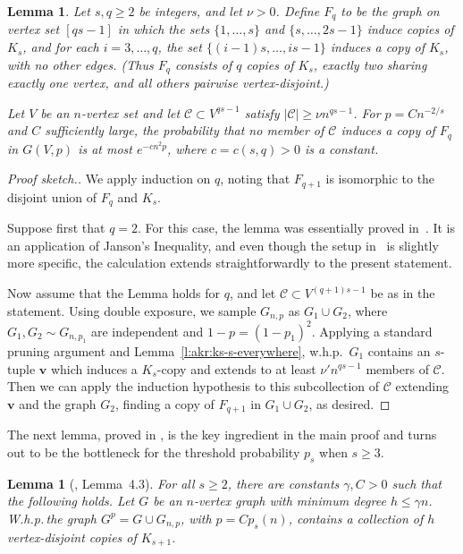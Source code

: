 \documentclass[reqno, 12pt]{amsart}
\numberwithin{equation}{section}
\numberwithin{figure}{section}
\theoremstyle{plain}
\newtheorem{lemma}[thm]{Lemma}
\theoremstyle{definition}
\def\cC{{\mathcal C}}
\def \Gnp{G_{n,p}}
\begin{document}
    \begin{lemma}
        \label{l:many_ks_and_one_ks-ks}
        Let $s,q\ge 2$ be integers, and let $\nu>0$.  
Define $F_q$ to be the graph on vertex set $[qs-1]$ in which the sets
$\{1,\dots,s\}$ and $\{s,\dots,2s-1\}$ induce copies of $K_s$, and for each
$i=3,\dots,q$, the set $\{(i-1)s,\dots,is-1\}$ induces a copy of $K_s$,
with no other edges. (Thus $F_q$ consists of $q$ copies of $K_s$, exactly two
sharing exactly one vertex, and all others pairwise vertex-disjoint.)

Let $V$ be an $n$-vertex set and let $\cC\subset V^{qs-1}$ satisfy
$|\cC|\ge \nu n^{qs-1}$. For $p=Cn^{-2/s}$ and $C$ sufficiently large, the probability that no member of $\cC$ induces a copy of $F_q$ in $G(V,p)$ is at most $e^{-c n^2 p}$, where $c=c(s,q)>0$ is a constant.
    \end{lemma}
    \begin{proof}
        [Proof sketch.] We apply induction on $q$, noting that $F_{q+1}$ is isomorphic to the disjoint union of $F_q$ and $K_s$.
        
        Suppose first that $q=2$. For this case, the lemma was essentially proved in~\cite[Lemma 9.2]{akr24}. It is an application of Janson's Inequality, and even though the setup in~\cite{akr24} is slightly more specific, the calculation extends straightforwardly to the present statement.

        Now assume that the Lemma holds for $q$, and let $\cC \subset V^{(q+1)s-1}$ be as in the statement. Using double exposure, we sample $\Gnp$ as $G_1\cup G_2$, where $G_1, G_2 \sim G_{n,p_1}$ are independent and $1-p = (1-p_1)^2$. Applying a standard pruning argument and Lemma~\ref{l:akr:ks-s-everywhere}, w.h.p.~$G_1$ contains an $s$-tuple $\textbf{v}$ %
        which induces a $K_s$-copy and extends to at least $\nu'n^{qs-1}$ members of $\cC$. Then we can apply the induction hypothesis to this subcollection of $\cC$ extending $\textbf{v}$ and the graph $G_2$, finding a copy of $F_{q+1}$ in $G_1 \cup G_2$, as desired.
    \end{proof}

    The next lemma, proved in \cite{akr24}, is the key ingredient in the main proof and turns out to be the bottleneck for the threshold probability $p_s$ when $s\geq 3$.
	
     \begin{lemma}[\cite{akr24},        Lemma~4.3]\label{l:5.5chr}
        For all $s\geq 2$, there are constants $\gamma, C>0$ such that the following holds. Let $G$ be an $n$-vertex graph with minimum degree $h\leq \gamma n$. W.h.p.\,the graph $G^p = G \cup \Gnp$, with $p = Cp_s(n)$, contains a collection of $h$ vertex-disjoint copies of $K_{s+1}$. 
    \end{lemma}
\end{document}
